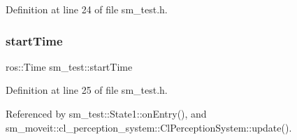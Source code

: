 Definition at line 24 of file sm\+\_\+test.\+h.

\mbox{\label{namespacesm__test_aa99c742599f6e6c98f883ce4c03f743b}} 
\subsubsection{\texorpdfstring{start\+Time}{startTime}}
{\footnotesize\ttfamily ros\+::\+Time sm\+\_\+test\+::start\+Time}



Definition at line 25 of file sm\+\_\+test.\+h.



Referenced by sm\+\_\+test\+::\+State1\+::on\+Entry(), and sm\+\_\+moveit\+::cl\+\_\+perception\+\_\+system\+::\+Cl\+Perception\+System\+::update().

